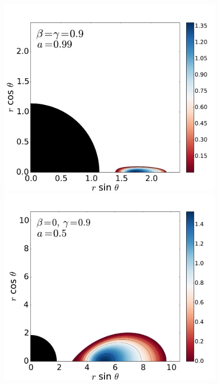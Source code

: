 \documentclass{aa}
\begin{document}
\begin{figure}
\includegraphics[scale=0.14]{figures/fig2_3_3.pdf}
\\
\includegraphics[scale=0.14]{figures/fig2_4_1.pdf}
\hspace{-0.3cm}

\end{figure}
\end{document}
